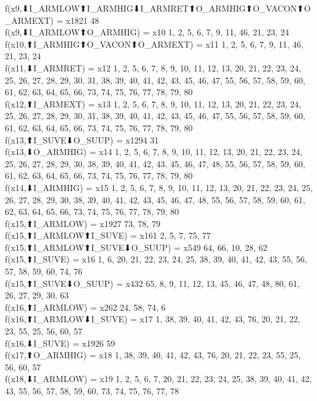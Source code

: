 f(x9,⬇I_ARMLOW⬆I_ARMHIG⬇I_ARMRET⬆O_ARMHIG⬆O_VACON⬆O_ARMEXT) = x1821 {48} \\
f(x9,⬇I_ARMLOW⬆O_ARMHIG) = x10 {1, 2, 5, 6, 7, 9, 11, 46, 21, 23, 24} \\
f(x10,⬆I_ARMHIG⬆O_VACON⬆O_ARMEXT) = x11 {1, 2, 5, 6, 7, 9, 11, 46, 21, 23, 24} \\
f(x11,⬇I_ARMRET) = x12 {1, 2, 5, 6, 7, 8, 9, 10, 11, 12, 13, 20, 21, 22, 23, 24, 25, 26, 27, 28, 29, 30, 31, 38, 39, 40, 41, 42, 43, 45, 46, 47, 55, 56, 57, 58, 59, 60, 61, 62, 63, 64, 65, 66, 73, 74, 75, 76, 77, 78, 79, 80} \\
f(x12,⬆I_ARMEXT) = x13 {1, 2, 5, 6, 7, 8, 9, 10, 11, 12, 13, 20, 21, 22, 23, 24, 25, 26, 27, 28, 29, 30, 31, 38, 39, 40, 41, 42, 43, 45, 46, 47, 55, 56, 57, 58, 59, 60, 61, 62, 63, 64, 65, 66, 73, 74, 75, 76, 77, 78, 79, 80} \\
f(x13,⬆I_SUVE⬇O_SUUP) = x1294 {31} \\
f(x13,⬇O_ARMHIG) = x14 {1, 2, 5, 6, 7, 8, 9, 10, 11, 12, 13, 20, 21, 22, 23, 24, 25, 26, 27, 28, 29, 30, 38, 39, 40, 41, 42, 43, 45, 46, 47, 48, 55, 56, 57, 58, 59, 60, 61, 62, 63, 64, 65, 66, 73, 74, 75, 76, 77, 78, 79, 80} \\
f(x14,⬇I_ARMHIG) = x15 {1, 2, 5, 6, 7, 8, 9, 10, 11, 12, 13, 20, 21, 22, 23, 24, 25, 26, 27, 28, 29, 30, 38, 39, 40, 41, 42, 43, 45, 46, 47, 48, 55, 56, 57, 58, 59, 60, 61, 62, 63, 64, 65, 66, 73, 74, 75, 76, 77, 78, 79, 80} \\
f(x15,⬆I_ARMLOW) = x1927 {73, 78, 79} \\
f(x15,⬆I_ARMLOW⬆I_SUVE) = x161 {2, 5, 7, 75, 77} \\
f(x15,⬆I_ARMLOW⬆I_SUVE⬇O_SUUP) = x549 {64, 66, 10, 28, 62} \\
f(x15,⬆I_SUVE) = x16 {1, 6, 20, 21, 22, 23, 24, 25, 38, 39, 40, 41, 42, 43, 55, 56, 57, 58, 59, 60, 74, 76} \\
f(x15,⬆I_SUVE⬇O_SUUP) = x432 {65, 8, 9, 11, 12, 13, 45, 46, 47, 48, 80, 61, 26, 27, 29, 30, 63} \\
f(x16,⬆I_ARMLOW) = x262 {24, 58, 74, 6} \\
f(x16,⬆I_ARMLOW⬇I_SUVE) = x17 {1, 38, 39, 40, 41, 42, 43, 76, 20, 21, 22, 23, 55, 25, 56, 60, 57} \\
f(x16,⬇I_SUVE) = x1926 {59} \\
f(x17,⬆O_ARMHIG) = x18 {1, 38, 39, 40, 41, 42, 43, 76, 20, 21, 22, 23, 55, 25, 56, 60, 57} \\
f(x18,⬇I_ARMLOW) = x19 {1, 2, 5, 6, 7, 20, 21, 22, 23, 24, 25, 38, 39, 40, 41, 42, 43, 55, 56, 57, 58, 59, 60, 73, 74, 75, 76, 77, 78} \\
